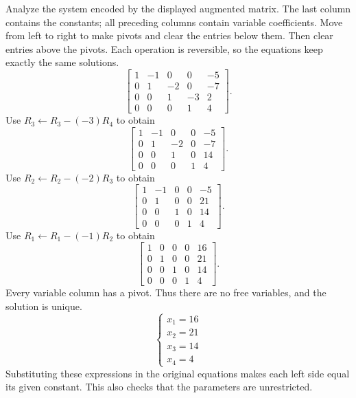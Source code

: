 \goal Analyze the system encoded by the displayed augmented matrix. The last column contains the constants; all preceding columns contain variable coefficients.
\idea Move from left to right to make pivots and clear the entries below them. Then clear entries above the pivots. Each operation is reversible, so the equations keep exactly the same solutions.
\[ \left[\begin{array}{rrrr|r}1&-1&0&0&-5\\0&1&-2&0&-7\\0&0&1&-3&2\\0&0&0&1&4\end{array}\right].\]
Use $R_{3}\leftarrow R_{3}-(-3)R_{4}$ to obtain
\[ \left[\begin{array}{rrrr|r}1&-1&0&0&-5\\0&1&-2&0&-7\\0&0&1&0&14\\0&0&0&1&4\end{array}\right].\]
Use $R_{2}\leftarrow R_{2}-(-2)R_{3}$ to obtain
\[ \left[\begin{array}{rrrr|r}1&-1&0&0&-5\\0&1&0&0&21\\0&0&1&0&14\\0&0&0&1&4\end{array}\right].\]
Use $R_{1}\leftarrow R_{1}-(-1)R_{2}$ to obtain
\[ \left[\begin{array}{rrrr|r}1&0&0&0&16\\0&1&0&0&21\\0&0&1&0&14\\0&0&0&1&4\end{array}\right].\]
Every variable column has a pivot. Thus there are no free variables, and the solution is unique.
\[ \begin{cases}x_{1}=16\\x_{2}=21\\x_{3}=14\\x_{4}=4\end{cases}\]
Substituting these expressions in the original equations makes each left side equal its given constant. This also checks that the parameters are unrestricted.

